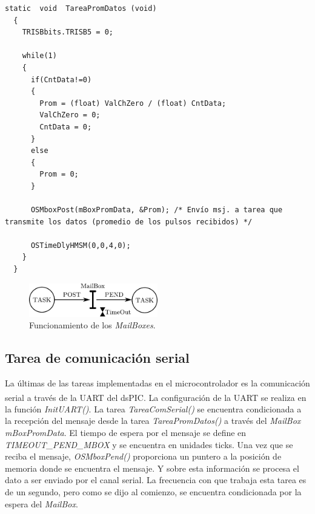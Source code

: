 \documentclass[11pt,a4paper,oneside]{article}
\begin{document}
\begin{lstlisting}[caption={Función de la tarea \emph{TareaPromDatos()}},label=code:func-tareaprom]
  static  void  TareaPromDatos (void)
  {
    TRISBbits.TRISB5 = 0;
    
    while(1)
    {
      if(CntData!=0)
      {
        Prom = (float) ValChZero / (float) CntData;
        ValChZero = 0;
        CntData = 0;
      }
      else
      {
        Prom = 0;
      }
      
      OSMboxPost(mBoxPromData, &Prom); /* Envío msj. a tarea que transmite los datos (promedio de los pulsos recibidos) */

      OSTimeDlyHMSM(0,0,4,0);
    }
  }
\end{lstlisting}

\begin{figure}[h]
  \centering
  \includegraphics[width=0.5\textwidth]{images/mailbox}
  \caption{Funcionamiento de los \emph{MailBoxes}.}
  \label{fig:mailbox}
\end{figure}

\subsection{Tarea de comunicación serial}
\label{sec:tarea-com-serial}

La últimas de las tareas implementadas en el microcontrolador es la comunicación serial a través de la UART del dsPIC\textsuperscript{\textregistered}. La configuración de la UART se realiza en la función \emph{InitUART()}. La tarea \emph{TareaComSerial()} se encuentra condicionada a la recepción del mensaje desde la tarea \emph{TareaPromDatos()} a través del \emph{MailBox mBoxPromData}. El tiempo de espera por el mensaje se define en \emph{TIMEOUT\_PEND\_MBOX} y se encuentra en unidades ticks. Una vez que se reciba el mensaje, \emph{OSMboxPend()} proporciona un puntero a la posición de memoria donde se encuentra el mensaje. Y sobre esta información se procesa el dato a ser enviado por el canal serial. La frecuencia con que trabaja esta tarea es de un segundo, pero como se dijo al comienzo, se encuentra condicionada por la espera del \emph{MailBox}.
\end{document}
